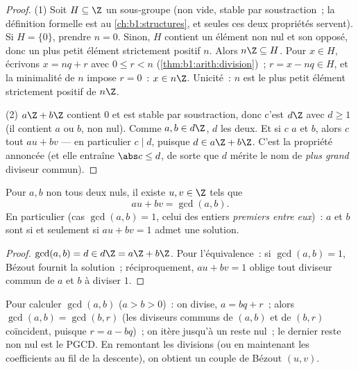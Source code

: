 \begin{proof}
(1) Soit $H \subseteq \Z$ un sous-groupe (non vide, stable par
soustraction~; la définition formelle est au \cref{ch:b1:structures},
et seules ces deux propriétés servent). Si $H = \{0\}$, prendre $n = 0$.
Sinon, $H$ contient un élément non nul et son opposé, donc un
plus petit élément strictement positif $n$. Alors $n\Z \subseteq H$. Pour $x
\in H$, écrivons $x = nq + r$ avec $0 \leq r < n$
(\cref{thm:b1:arith:division})~; $r = x - nq \in H$, et la minimalité de
$n$ impose $r = 0$~: $x \in n\Z$. Unicité~: $n$ est le plus petit élément
strictement positif de $n\Z$.

(2) $a\Z + b\Z$ contient $0$ et est stable par soustraction, donc c'est
$d\Z$ avec $d \geq 1$ (il contient $a$ ou $b$, non nul). Comme $a, b
\in d\Z$, $d$  les deux. Et si $c$  $a$ et $b$, alors $c$
 tout $au + bv$ --- en particulier $c \mid d$, puisque $d \in a\Z
+ b\Z$. C'est la propriété annoncée (et elle entraîne $\abs c \leq
d$, de sorte que $d$ mérite le nom de \emph{plus grand} diviseur commun).
\end{proof}

\begin{corollary}\label{cor:b1:arith:bezout}
Pour $a, b$ non tous deux nuls, il existe $u, v \in \Z$ tels que
\[
au + bv = \gcd(a, b) .
\]
En particulier (cas $\gcd(a,b) = 1$, celui des entiers
\emph{premiers entre eux})~: $a$ et $b$ sont
 si et seulement si $au + bv = 1$ admet une
solution.
\end{corollary}

\begin{proof}
$\gcd(a,b) = d \in d\Z = a\Z + b\Z$. Pour l'équivalence~: si
$\gcd(a,b) = 1$, Bézout fournit la solution~; réciproquement, $au + bv =
1$ oblige tout diviseur commun de $a$ et $b$ à diviser $1$.
\end{proof}

\begin{method}\label{met:b1:arith:euclid}
Pour calculer $\gcd(a, b)$ ($a > b > 0$)~: on divise, $a = bq + r$~; alors
$\gcd(a, b) = \gcd(b, r)$ (les diviseurs communs de $(a,b)$ et de $(b,r)$
coïncident, puisque $r = a - bq$)~; on itère jusqu'à un reste nul~; le
dernier reste non nul est le PGCD. En
remontant les divisions (ou en maintenant les coefficients au fil de la
descente), on obtient un couple de Bézout $(u, v)$.
\end{method}

